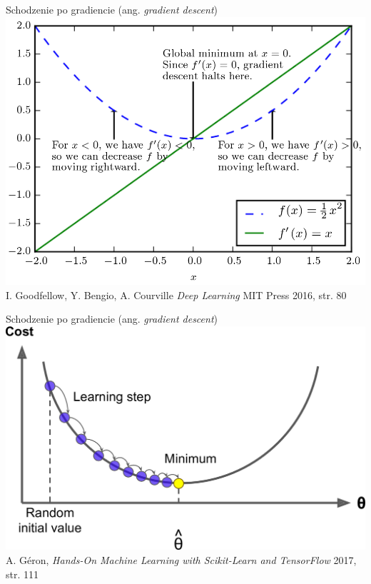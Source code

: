 \documentclass{sa}
\subtitle{Regularyzacja}
\newcommand{\ang}[1]{(ang. \emph{#1})}
\begin{document}
\begin{frame}
\titlepage
\end{frame}

\begin{frame}{Schodzenie po gradiencie \ang{gradient descent}}
\centering
\includegraphics[width=.87\textwidth]{grad.png}
{\vfill\footnotesize I. Goodfellow, Y. Bengio, A. Courville \emph{Deep Learning} MIT Press 2016, str. 80}
\end{frame}

\begin{frame}{Schodzenie po gradiencie \ang{gradient descent}}
\centering
\includegraphics[width=.95\textwidth]{grad2.png}
{\vfill\footnotesize A. Géron, \emph{Hands-On Machine Learning with Scikit-Learn and TensorFlow} 2017, str. 111}
\end{frame}
\end{document}

